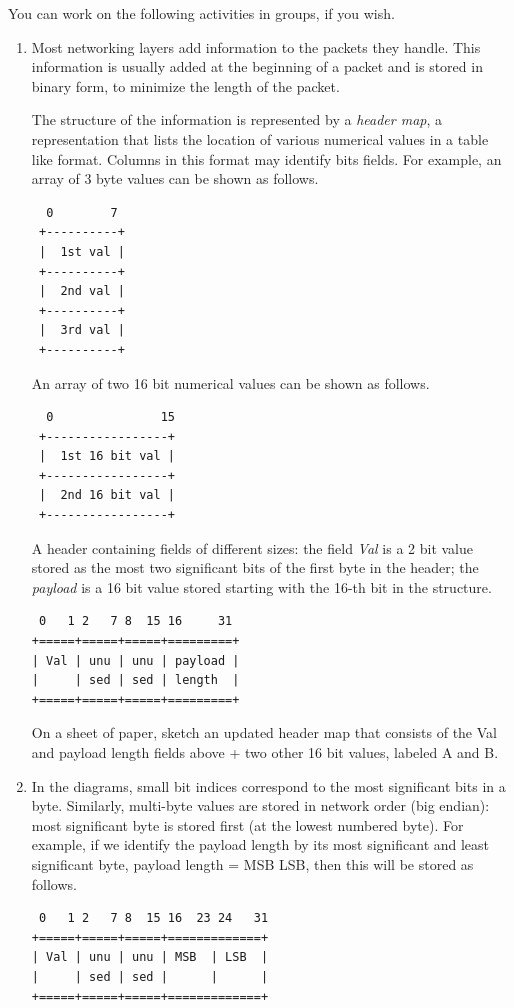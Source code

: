 \documentclass[12pt]{book}
\begin{document}
You can work on the following activities in groups, if you wish.

\begin{enumerate}[label=Activity \arabic*:]
\item Most networking layers add information to the packets they handle. This information is usually added at the beginning of a packet and is stored in binary form, to minimize the length of the packet.

  The structure of the information is represented by a \emph{header map}, a representation that lists the location of various numerical values in a table like format. Columns in this format may identify bits fields. For example, an array of 3 byte values can be shown as follows.

\begin{verbatim}
  0        7
 +----------+
 |  1st val |
 +----------+
 |  2nd val |
 +----------+
 |  3rd val |
 +----------+
\end{verbatim}

An array of two 16 bit numerical values can be shown as follows.
\begin{verbatim}
  0               15
 +-----------------+
 |  1st 16 bit val |
 +-----------------+
 |  2nd 16 bit val |
 +-----------------+
\end{verbatim}

A header containing fields of different sizes: the field \emph{Val} is a 2 bit value stored as the most two significant bits of the first byte in the header; the \emph{payload} is a 16 bit value stored starting with the 16-th bit in the structure.
\begin{verbatim}
 0   1 2   7 8  15 16     31
+=====+=====+=====+=========+
| Val | unu | unu | payload |
|     | sed | sed | length  |
+=====+=====+=====+=========+ 
\end{verbatim}

On a sheet of paper, sketch an updated header map that consists of the Val and payload length fields above + two other 16 bit values, labeled A and B.


\item In the diagrams, small bit indices correspond to the most significant bits in a byte. Similarly, multi-byte values are stored in network order (big endian): most significant byte is stored first (at the lowest numbered byte). For example, if we identify the payload length by its most significant and least significant byte, payload length = MSB LSB, then this will be stored as follows.
\begin{verbatim}
 0   1 2   7 8  15 16  23 24   31
+=====+=====+=====+=============+
| Val | unu | unu | MSB  | LSB  |
|     | sed | sed |      |      |
+=====+=====+=====+=============+ 
\end{verbatim}


\end{enumerate}
\end{document}
